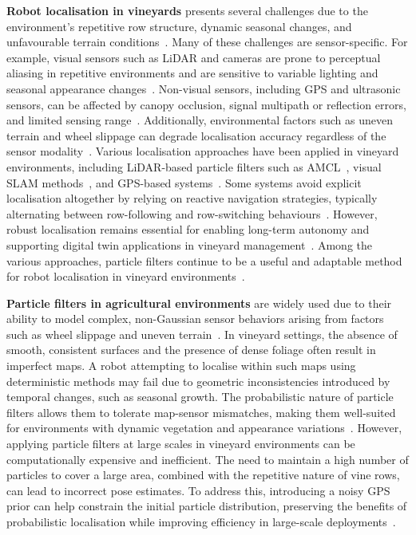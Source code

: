 \documentclass[letterpaper, 10 pt, conference]{ieeeconf}
\begin{document}
\textbf{Robot localisation in vineyards} presents several challenges due to the environment’s repetitive row structure, dynamic seasonal changes, and unfavourable terrain conditions~\cite{kokas2024multicamera, agriculture11100954}. Many of these challenges are sensor-specific. For example, visual sensors such as LiDAR and cameras are prone to perceptual aliasing in repetitive environments and are sensitive to variable lighting and seasonal appearance changes~\cite{hroob2021benchmark, shi2025vision}. Non-visual sensors, including GPS and ultrasonic sensors, can be affected by canopy occlusion, signal multipath or reflection errors, and limited sensing range~\cite{agronomy11020287, costley2020landmark}. Additionally, environmental factors such as uneven terrain and wheel slippage can degrade localisation accuracy regardless of the sensor modality~\cite{rakun2022sensor}. Various localisation approaches have been applied in vineyard environments, including LiDAR-based particle filters such as AMCL~\cite{astolfi2018vineyard, s22239095}, visual SLAM methods~\cite{kokas2024multicamera, automation4040018}, and GPS-based systems~\cite{rakun2022sensor, 9249176}. Some systems avoid explicit localisation altogether by relying on reactive navigation strategies, typically alternating between row-following and row-switching behaviours~\cite{10341261}. However, robust localisation remains essential for enabling long-term autonomy and supporting digital twin applications in vineyard management~\cite{polvara2024bacchus, kunze2018artificial}. Among the various approaches, particle filters continue to be a useful and adaptable method for robot localisation in vineyard environments~\cite{aguiar2022localization}.

\textbf{Particle filters in agricultural environments} are widely used due to their ability to model complex, non-Gaussian sensor behaviors arising from factors such as wheel slippage and uneven terrain~\cite{cerrato2020gps}. In vineyard settings, the absence of smooth, consistent surfaces and the presence of dense foliage often result in imperfect maps. A robot attempting to localise within such maps using deterministic methods may fail due to geometric inconsistencies introduced by temporal changes, such as seasonal growth. The probabilistic nature of particle filters allows them to tolerate map-sensor mismatches, making them well-suited for environments with dynamic vegetation and appearance variations~\cite{blok2019robot}. However, applying particle filters at large scales in vineyard environments can be computationally expensive and inefficient. The need to maintain a high number of particles to cover a large area, combined with the repetitive nature of vine rows, can lead to incorrect pose estimates. To address this, introducing a noisy GPS prior can help constrain the initial particle distribution, preserving the benefits of probabilistic localisation while improving efficiency in large-scale deployments~\cite{oh2004map}.
\end{document}
